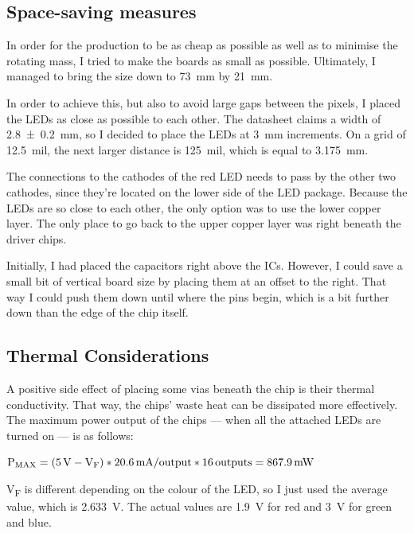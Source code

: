 \documentclass[a4paper, 11pt, titlepage]{report}
\newenvironment{ownmath}
{\vspace{2mm}\hspace{15pt}\begin{math}}
{\end{math}\vspace{2mm}}
\begin{document}
\subsection{Space-saving measures}

In order for the production to be as cheap as possible as well as to minimise the rotating mass, I 
tried to make the boards as small as possible. Ultimately, I managed to bring the size down to 
\SI{73}{\milli\meter} by \SI{21}{\milli\meter}.

In order to achieve this, but also to avoid large gaps between the pixels, I placed the LEDs as 
close as possible to each other. The datasheet claims a width of \SI{2.8 +- 0.2}{\milli\meter}, 
so I decided to place the LEDs at \SI{3}{\milli\metre} increments. On a grid of \SI{12.5}{mil}, 
the next larger distance is \SI{125}{mil}, which is equal to \SI{3.175}{mm}.

The connections to the cathodes of the red LED needs to pass by the other two cathodes, since 
they're located on the lower side of the LED package. Because the LEDs are so close to each other, 
the only option was to use the lower copper layer. The only place to go back to the upper copper 
layer was right beneath the driver chips.

Initially, I had placed the capacitors right above the ICs. However, I could save a small bit of
vertical board size by placing them at an offset to the right. That way I could push them down 
until where the pins begin, which is a bit further down than the edge of the chip itself.


\subsection{Thermal Considerations}

A positive side effect of placing some vias beneath the chip is their thermal conductivity. That
way, the chips' waste heat can be dissipated more effectively. The maximum power output of the 
chips --- when all the attached LEDs are turned on --- is as follows:

\begin{ownmath}
\textrm{P\textsubscript{MAX}} = (\SI{5}{\volt} - \textrm{V\textsubscript{F}}) * 
\SI{20.6}{\milli\ampere\per output} * \SI{16}{outputs} = \SI{867.9}{\milli\watt}
\end{ownmath}

V\textsubscript{F} is different depending on the colour of the LED, so I just used the average
value, which is \SI{2.633}{\volt}. The actual values are \SI{1.9}{\volt} for red and \SI{3}{\volt}
for green and blue.
\end{document}
